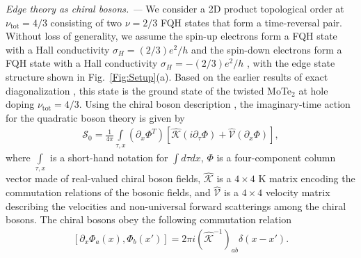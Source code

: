 \documentclass[aps,prx,amsmath,superscriptaddress,twocolumn,bibnotes,longbibliography,floatfix]{revtex4-2}
\begin{document}
	\textit{Edge theory as chiral bosons. ---} We consider a 2D product topological order at $\nu_{\text{tot}}=4/3$ consisting of two $\nu=2/3$ FQH states that form a time-reversal pair. Without loss of generality, we assume the spin-up electrons form a FQH state with a Hall conductivity $\sigma_H=(2/3)e^2/h$ and the spin-down electrons form a FQH state with a Hall conductivity $\sigma_H=-(2/3)e^2/h$ \cite{minTO}, with the edge state structure shown in Fig.~\ref{Fig:Setup}(a). Based on the earlier results of exact diagonalization \cite{WangY2026,KwanYH2026a}, this state is the ground state of the twisted MoTe$_2$ at hole doping $\nu_{\text{tot}}=4/3$. Using the chiral boson description \cite{WenXG1992,ChangAM2003,NeupertT2011a}, the imaginary-time action for the quadratic boson theory is given by
	\begin{align}\label{Eq:S_0}
		\mathcal{S}_0=\frac{1}{4\pi}\int\limits_{\tau,x} \left(\partial_x\Phi^T\right)\left[\hat{\mathcal{K}}\left(i\partial_{\tau}\Phi\right)+\hat{\mathcal{V}}\left(\partial_x\Phi\right)\right],
	\end{align}
	where $\int\limits_{\tau,x}$ is a short-hand notation for $\int d\tau dx$, $\Phi$ is a four-component column vector made of real-valued chiral boson fields, $\hat{\mathcal{K}}$ is a $4\times 4$ K matrix encoding the commutation relations of the bosonic fields, and $\hat{\mathcal{V}}$ is a $4\times 4$ velocity matrix describing the velocities and non-universal forward scatterings among the chiral bosons. The chiral bosons obey the following commutation relation
	\begin{align}
		\left[\partial_x\Phi_a(x),\Phi_b(x')\right]=2\pi i \left(\hat{\mathcal{K}}^{-1}\right)_{ab}\delta(x-x').
	\end{align}
\end{document}
